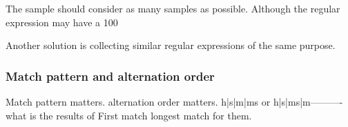 The sample should consider as many samples as possible. Although the regular expression may have a 100%

Another solution is collecting similar regular expressions of the same purpose.
\subsubsection{Match pattern and alternation order}
Match pattern matters. 
alternation order matters. h|s|m|ms or h|s|ms|m----------what is the results of First match longest match for them.
